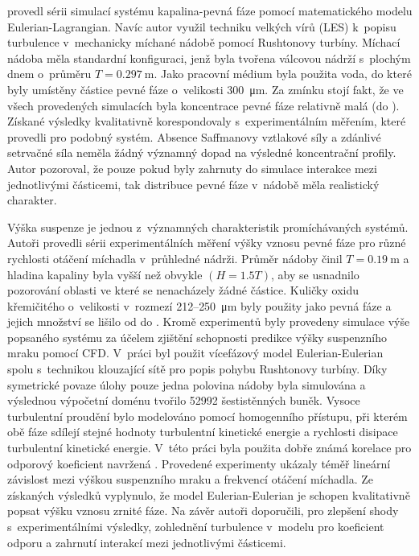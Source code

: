 \citet{derk03} provedl sérii simulací systému kapalina-pevná fáze pomocí matematického modelu Eulerian-Lagrangian. Navíc autor využil techniku velkých vírů (LES) k~popisu turbulence v~mechanicky míchané nádobě pomocí Rushtonovy turbíny. Míchací nádoba měla standardní konfiguraci, jenž byla tvořena válcovou nádrží s~plo\-chým dnem o~průměru $T=\SI{0.297}{\meter}$. Jako pracovní médium byla použita voda, do které byly umístěny částice pevné fáze o~velikosti \SI{300}{\micro\meter}. Za zmínku stojí fakt, že ve všech provedených simulacích byla koncentrace pevné fáze relativně malá (do ). Získané výsledky kvalitativně korespondovaly s~experimentálním měřením, které provedli \citet{miche03} pro podobný systém. Absence Saffmanovy vztlakové síly a zdánlivé setrvačné síla neměla žádný významný dopad na výsledné koncentrační profily. Autor pozoroval, že pouze pokud byly zahrnuty do simulace interakce mezi jednotlivými částicemi, tak distribuce pevné fáze v~nádobě měla realistický charakter. 

Výška suspenze je jednou z~významných charakteristik promíchávaných systémů. Autoři \citet{mic04} provedli sérii experimentálních měření výšky vznosu pevné fáze pro různé rychlosti otáčení míchadla v~průhledné nádrži. Průměr nádoby činil $T=\SI{0.19}{\meter}$ a hladina kapaliny byla vyšší než obvykle $(H=\num{1.5}T)$, aby se usnadnilo pozorování oblasti ve které se nenacházely žádné částice. Kuličky oxidu křemičitého o~velikosti v~rozmezí \num{212}--\SI{250}{\micro\meter} byly použity jako pevná fáze a jejich množství se lišilo od  do . Kromě experimentů byly provedeny simulace výše popsaného systému za účelem zjištění schopnosti predikce výšky suspenzního mraku pomocí CFD. V~práci byl použit vícefázový model Eulerian-Eulerian spolu s~technikou klouzající sítě pro popis pohybu Rushtonovy turbíny. Díky symetrické povaze úlohy pouze jedna polovina nádoby byla simulována a výslednou výpočetní doménu tvořilo \num{52992} šestistěnných buněk. Vysoce turbulentní proudění bylo modelováno pomocí homogenního \keps{} přístupu, při kterém obě fáze sdílejí stejné hodnoty turbulentní kinetické energie a rychlosti disipace turbulentní kinetické energie. V~této práci byla použita dobře známá korelace pro odporový koeficient navržená \citet{schi32}. Provedené experimenty ukázaly téměř lineární závislost mezi výškou suspenzního mraku a frekvencí otáčení míchadla. Ze získaných výsledků vyplynulo, že model Eulerian-Eulerian je schopen kvalitativně popsat výšku vznosu zrnité fáze. Na závěr autoři doporučili, pro zlepšení shody s~experimentálními výsledky, zohlednění turbulence v~modelu pro koeficient odporu a zahrnutí interakcí mezi jednotlivými částicemi.

